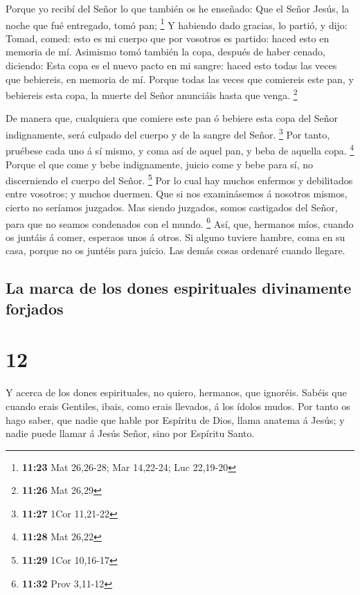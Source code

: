  Porque yo recibí del Señor lo que también os he enseñado:
Que el Señor Jesús, la noche que fué entregado, tomó pan; \footnote{\textbf{11:23}
  Mat 26,26-28; Mar 14,22-24; Luc 22,19-20}  Y habiendo
dado gracias, lo partió, y dijo: Tomad, comed: esto es mi cuerpo que por
vosotros es partido: haced esto en memoria de mí.  Asimismo
tomó también la copa, después de haber cenado, diciendo: Esta copa es el
nuevo pacto en mi sangre: haced esto todas las veces que bebiereis, en
memoria de mí.  Porque todas las veces que comiereis este
pan, y bebiereis esta copa, la muerte del Señor anunciáis hasta que
venga. \footnote{\textbf{11:26} Mat 26,29}

 De manera que, cualquiera que comiere este pan ó bebiere
esta copa del Señor indignamente, será culpado del cuerpo y de la sangre
del Señor. \footnote{\textbf{11:27} 1Cor 11,21-22}  Por
tanto, pruébese cada uno á sí mismo, y coma así de aquel pan, y beba de
aquella copa. \footnote{\textbf{11:28} Mat 26,22}  Porque
el que come y bebe indignamente, juicio come y bebe para sí, no
discerniendo el cuerpo del Señor. \footnote{\textbf{11:29} 1Cor 10,16-17}
 Por lo cual hay muchos enfermos y debilitados entre
vosotros; y muchos duermen.  Que si nos examinásemos á
nosotros mismos, cierto no seríamos juzgados.  Mas siendo
juzgados, somos castigados del Señor, para que no seamos condenados con
el mundo. \footnote{\textbf{11:32} Prov 3,11-12}  Así, que,
hermanos míos, cuando os juntáis á comer, esperaos unos á otros.
 Si alguno tuviere hambre, coma en su casa, porque no os
juntéis para juicio. Las demás cosas ordenaré cuando llegare.

\hypertarget{la-marca-de-los-dones-espirituales-divinamente-forjados}{%
\subsection{La marca de los dones espirituales divinamente
forjados}\label{la-marca-de-los-dones-espirituales-divinamente-forjados}}

\hypertarget{section-11}{%
\section{12}\label{section-11}}

 Y acerca de los dones espirituales, no quiero, hermanos,
que ignoréis.  Sabéis que cuando erais Gentiles, ibais, como
erais llevados, á los ídolos mudos.  Por tanto os hago
saber, que nadie que hable por Espíritu de Dios, llama anatema á Jesús;
y nadie puede llamar á Jesús Señor, sino por Espíritu Santo.

